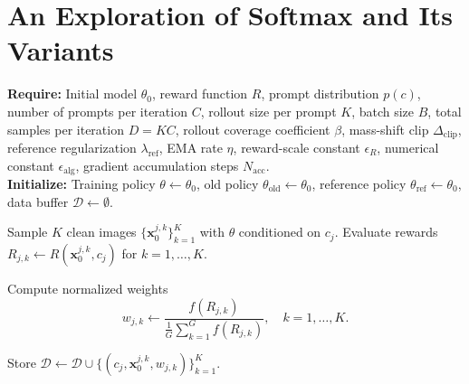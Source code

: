 \documentclass[10pt]{article} %
\begin{document}
\section{An Exploration of Softmax and Its Variants}
\begin{algorithm}[H]
    \caption{Single Target Loss Exploration of Softmax Scheme}
    \label{alg:velocity-add-delete}
    \textbf{Require:} Initial model $\theta_0$, reward function $R$, prompt distribution $p(c)$, number of prompts per iteration $C$, rollout size per prompt $K$, batch size $B$, total samples per iteration $D = KC$, rollout coverage coefficient $\beta$, mass-shift clip $\Delta_{\mathrm{clip}}$, reference regularization $\lambda_{\mathrm{ref}}$, EMA rate $\eta$, reward-scale constant $\epsilon_R$, numerical constant $\epsilon_{\mathrm{alg}}$, gradient accumulation steps $N_{\mathrm{acc}}$.\\
    \textbf{Initialize:} Training policy $\theta \leftarrow \theta_0$, old policy $\theta_{\mathrm{old}} \leftarrow \theta_0$, reference policy $\theta_{\mathrm{ref}} \leftarrow \theta_0$, data buffer $\mathcal{D} \leftarrow \emptyset$.
    \begin{algorithmic}[1]
             
                \State Sample $K$ clean images $\{\mathbf{x}_0^{j,k}\}_{k=1}^{K}$ with $\theta$ conditioned on $c_j$.
                \State Evaluate rewards $R_{j,k} \leftarrow R(\mathbf{x}_0^{j,k}, c_j)$ for $k = 1, \dots, K$.
            \EndFor




                \State Compute normalized weights
                \[
                    w_{j,k} \leftarrow \frac{f(R_{j,k})}{\frac{1}{G}\sum_{k=1}^{G}f(R_{j,k})},
                    \quad k = 1, \dots, K.
                \]

                \State Store
                $\mathcal{D}\leftarrow\mathcal{D}\cup
                \{(c_j,\mathbf{x}_0^{j,k},w_{j,k})\}_{k=1}^{K}$.
            \EndFor


\end{algorithmic}
\end{algorithm}
\end{document}
